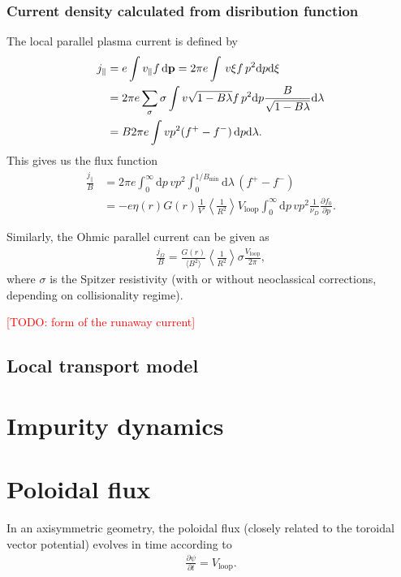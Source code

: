 \documentclass[11pt,a4paper]{article}
\newcommand{\rd}{\ensuremath{\mathrm{d}}}
\newcommand{\sub}[1]{\ensuremath{_{\text{#1}}}}
\renewcommand{\b}[1]{\ensuremath{ {\bf #1 } }}
\begin{document}
\subsubsection*{Current density calculated from disribution function}
The local parallel plasma current is defined by
\begin{align}
j_\parallel &= e\int v_\parallel f \,\rd\b{p} = 2\pi e \int \, v\xi f \,p^2\rd p\rd\xi \nonumber \\
&= 2\pi e \sum_\sigma \sigma \int v\sqrt{1-B\lambda}  f \,p^2 \rd p \frac{B}{\sqrt{1-B\lambda}}  \rd \lambda \nonumber \\
&= B 2\pi e \int vp^2 (f^+-f^-) \,\rd p \rd \lambda.
\end{align}
This gives us the flux function
\begin{align}
\frac{j_\parallel}{B} &= 2\pi e \int_0^\infty \rd p \, vp^2 \int_0^{1/B\sub{min}} \rd \lambda \,(f^+-f^-) \nonumber \\
&= - e \eta(r) G(r)\frac{1}{V'}\left\langle  \frac{1}{R^2} \right\rangle  V\sub{loop} \int_0^\infty \rd p \, vp^2 \frac{1}{\nu_D}\frac{\partial f_0}{\partial p}.
\end{align}

Similarly, the Ohmic parallel current can be given as
\begin{align}
\frac{j_\Omega}{B} = \frac{G(r)}{\langle B^2\rangle}\left\langle \frac{1}{R^2} \right\rangle  \sigma\frac{V\sub{loop}}{2\pi},
\end{align}
where $\sigma$ is the Spitzer resistivity (with or without neoclassical corrections, depending on collisionality regime).

\textcolor{red}{[TODO: form of the runaway current]}


\subsection{Local transport model}



\section{Impurity dynamics}



\section{Poloidal flux}
In an axisymmetric geometry, the poloidal flux (closely related to the toroidal vector potential) evolves in time according to
\begin{align}
\frac{\partial \psi}{\partial t} = V\sub{loop}.
\end{align}
\end{document}
